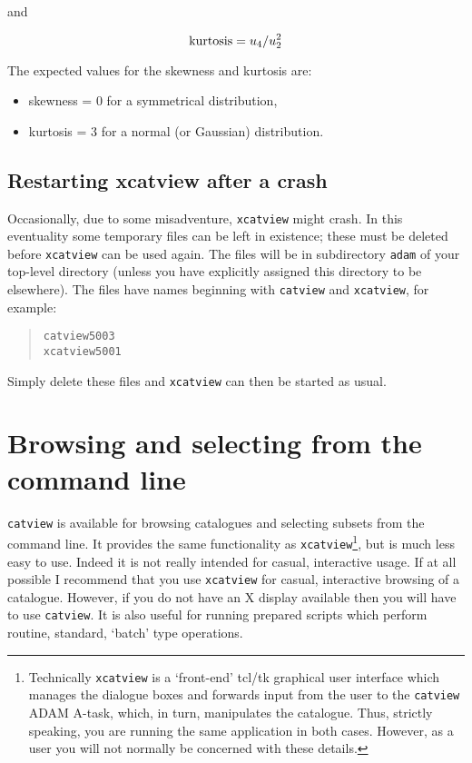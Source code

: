 \documentclass[twoside,11pt]{article}
\newcommand{\xlabel}[1]{}
\renewcommand{\_}{\texttt{\symbol{95}}}
\begin{document}
\begin{itemize}
   and

  \begin{equation}
   {\rm kurtosis} = u_{4} / u_{2}^{2}
  \end{equation}

   The expected values for the skewness and kurtosis are:

  \begin{itemize}

    \item skewness = 0 for a symmetrical distribution,

    \item kurtosis = 3 for a normal (or Gaussian) distribution.

  \end{itemize}

\end{itemize}

\subsection{Restarting xcatview after a crash}

Occasionally, due to some misadventure, {\tt xcatview} might crash.  In
this eventuality some temporary files can be left in existence; these must
be deleted before {\tt xcatview} can be used again.  The files will be in
subdirectory {\tt adam} of your top-level directory (unless you have
explicitly assigned this directory to be elsewhere).  The files have names
beginning with {\tt catview} and {\tt xcatview}, for example:

\begin{verse}
{\tt catview\_5003  \\
xcatview\_5001}
\end{verse}

Simply delete these files and {\tt xcatview} can then be started as usual.


\section{\xlabel{VIEW}\label{VIEW}Browsing and selecting from the command line}

{\tt catview} is available for browsing catalogues and selecting subsets
from the command line. It provides the same functionality as
{\tt xcatview}\footnote{Technically {\tt xcatview} is a `front-end'
tcl/tk graphical user interface which manages the dialogue boxes and
forwards input from the user to the {\tt catview} ADAM A-task, which,
in turn, manipulates the catalogue. Thus, strictly speaking, you are
running the same application in both cases. However, as a user you will
not normally be concerned with these details.}, but is much less easy to
use. Indeed it is not really intended for casual, interactive usage. If at
all possible I recommend that you use {\tt xcatview} for casual, interactive
browsing of a catalogue. However, if you do not have an X display available 
then you will have to use {\tt catview}. It is also useful for running 
prepared scripts which perform routine, standard, `batch' type operations.
\end{document}
